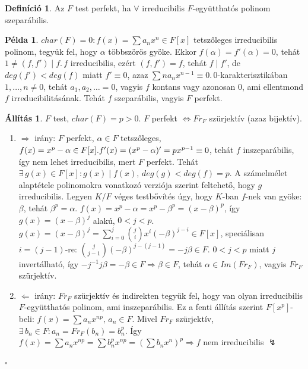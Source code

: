 \documentclass{article}
\theoremstyle{definition}
\newtheorem{all}[tetel]{Állítás}
\newtheorem{defi}[tetel]{Definíció}
\newtheorem{pl}[tetel]{Példa}
\newenvironment{biz}{\par\noindent{\bf Bizonyítás.}\enspace\ignorespaces}{\hfill$\square$\par}
\begin{document}
\begin{defi}
    Az $F$ test perfekt, ha $\forall$ irreducibilis $F$-együtthatós polinom szeparábilis.
\end{defi}

\begin{pl}
    $char(F) = 0: f(x) = \sum a_nx^n \in F[x]$ tetszőleges irreducibilis polinom, tegyük fel, hogy $\alpha$ többszörös gyöke. Ekkor $f (\alpha) = f'(\alpha) = 0$, tehát $1 \ne (f, f') \mid f. \, f$ irreducibilis, ezért $(f, f') = f$, tehát $f \mid f'$, de $deg(f') < deg(f)$ miatt $f' \equiv 0$, azaz $\sum na_nx^{n-1} \equiv 0. \, 0$-karakterisztikában $1, \dots, n \ne 0$, tehát $a_1, a_2, \dots = 0$, vagyis $f$ kontans vagy azonosan $0$, ami ellentmond $f$ irreducibilitásának. Tehát $f$ szeparábilis, vagyis $F$ perfekt.
\end{pl}

\begin{all}
    $F$ test, $char(F) = p > 0$. $F$ perfekt $\Leftrightarrow Fr_F$ szürjektív (azaz bijektív).
\end{all}

\begin{biz}
    \begin{enumerate}
        \item $\Rightarrow$ irány: $F$ perfekt, $\alpha \in F$ tetszőleges, $f(x) = x^p - \alpha \in F[x]. \\ f'(x) = (x^p  - \alpha)' = px^{p-1} \equiv 0$, tehát $f$ inszeparábilis, így nem lehet irreducibilis, mert $F$ perfekt. Tehát $\exists \, g(x) \in F[x]: g(x) \mid f(x), \, deg(g) < deg(f) = p$. A számelmélet alaptétele polinomokra vonatkozó verziója szerint feltehető, hogy $g$ irreducibilis. Legyen $K/F$ véges testbővítés úgy, hogy $K$-ban $f$-nek van gyöke: $\beta$, tehát $\beta ^p = \alpha$.
        $f(x) = x^p - \alpha = x^p - \beta ^p = (x - \beta)^p$, így $g(x) = (x - \beta)^j$ alakú, $0 < j < p$.
        $g(x) = (x - \beta)^j = \sum_{i=0}^{j} \binom{j}{i} x^i(-\beta)^{j-i} \in F[x]$, speciálisan $i = (j - 1)$-re: $\binom{j}{j-1}(-\beta)^{j-(j-1)} = -j\beta \in F. \, \, 0 < j < p$ miatt $j$ invertálható, így $-j^{-1}j\beta = -\beta \in F \Rightarrow \beta \in F$, tehát $\alpha \in Im(Fr_F)$, vagyis $Fr_F$ szürjektív.
        \item $\Leftarrow$ irány: $Fr_F$ szürjektív és indirekten tegyük fel, hogy van olyan irreducibilis $F$-együtthatós polinom, ami inszeparábilis. Ez a fenti állítás szerint $F[x^p]$-beli: $f(x) = \sum a_nx^{np}, \, a_n \in F$. Mivel $Fr_F$ szürjektív, $\exists \, b_n \in F: a_n = Fr_F(b_n) = b_n^p$. Így $f(x) =  \sum a_nx^{np} = \sum b_n^px^{np} = {(\sum b_nx^n)}^p \Rightarrow f$ nem irreducibilis $\lightning$
    \end{enumerate}
\end{biz}
\end{document}
